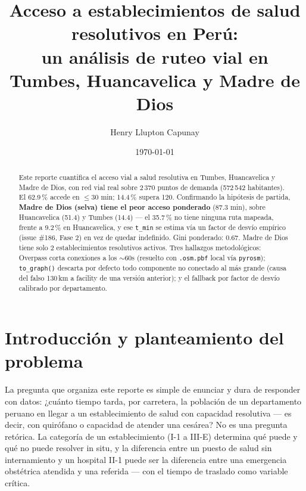 \documentclass[11pt]{article}
\title{Acceso a establecimientos de salud resolutivos en Perú:\\
un análisis de ruteo vial en Tumbes, Huancavelica y Madre de Dios}
\author{Henry Llupton Capunay}
\date{\today}
\begin{document}
\maketitle

\begin{abstract}
Este reporte cuantifica el acceso vial a salud resolutiva en Tumbes,
Huancavelica y Madre de Dios, con red vial real sobre 2\,370 puntos de
demanda (572\,542 habitantes). El 62.9\,\% accede en $\le$30 min; 14.4\,\%
supera 120. Confirmando la hipótesis de partida, \textbf{Madre
de Dios (selva) tiene el peor acceso ponderado} (87.3 min), sobre
Huancavelica (51.4) y Tumbes (14.4) --- el 35.7\,\% no tiene ninguna ruta
mapeada, frente a 9.2\,\% en Huancavelica, y ese \texttt{t\_min} se estima
vía un factor de desvío empírico (issue \#186, Fase 2) en vez de quedar
indefinido. Gini ponderado: 0.67. Madre de Dios tiene solo 2 establecimientos resolutivos activos.
Tres hallazgos metodológicos: Overpass corta conexiones a los ${\sim}60$s
(resuelto con \texttt{.osm.pbf} local vía \texttt{pyrosm});
\texttt{to\_graph()} descarta por defecto todo componente no conectado al
más grande (causa del falso 130\,km a facility de una versión anterior); y
el fallback por factor de desvío calibrado por departamento.
\end{abstract}

\tableofcontents

\section{Introducción y planteamiento del problema}

La pregunta que organiza este reporte es simple de enunciar y dura de
responder con datos: ¿cuánto tiempo tarda, por carretera, la población de un
departamento peruano en llegar a un establecimiento de salud con capacidad
resolutiva --- es decir, con quirófano o capacidad de atender una cesárea?
No es una pregunta retórica. La categoría de un establecimiento (I-1 a
III-E) determina qué puede y qué no puede resolver in situ, y la diferencia
entre un puesto de salud sin internamiento y un hospital II-1 puede ser la
diferencia entre una emergencia obstétrica atendida y una referida --- con
el tiempo de traslado como variable crítica.
\end{document}
